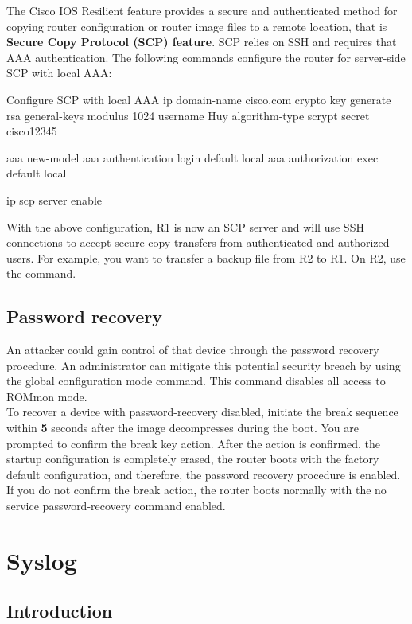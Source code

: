 The Cisco IOS Resilient feature provides a  secure and authenticated method for copying router configuration or router image files to a remote location, that is \textbf{Secure Copy Protocol (SCP) feature}. SCP relies on SSH and requires that AAA authentication.  The following commands configure the router for server-side SCP with local AAA:

\begin{sexylisting}{Configure SCP with local AAA}
ip domain-name cisco.com
crypto key generate rsa general-keys modulus 1024
username Huy algorithm-type scrypt secret cisco12345

aaa new-model 
aaa authentication login default local 
aaa authorization exec default local

ip scp server enable
\end{sexylisting}

With the above configuration, R1 is now an SCP server and will use SSH connections to accept secure copy transfers from authenticated and authorized users. For example, you want to transfer a backup file from R2 to R1. On R2, use the  command.

\subsection{Password recovery}

An attacker could gain control of that device through the password recovery procedure. An administrator can mitigate this potential security breach by using the  global configuration mode command. This command disables all access to ROMmon mode. \\

To recover a device with password-recovery disabled, initiate the break sequence within \textbf{5} seconds after the image decompresses during the boot. You are prompted to confirm the break key action. After the action is confirmed, the startup configuration is completely erased, the router boots with the factory default configuration, and therefore, the password recovery procedure is enabled. If you do not confirm the break action, the router boots normally with the no service password-recovery command enabled.

\section{Syslog}

\subsection{Introduction}

